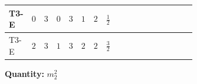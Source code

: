 \documentclass[8pt]{article}
\begin{document}
\begin{landscape}
\begin{longtable}{@{}llcccccc >{\raggedright\arraybackslash}p{0.21\linewidth} >{\raggedright\arraybackslash}p{0.21\linewidth} >{\raggedright\arraybackslash}p{0.21\linewidth}@{}}
\midrule
T3-E & $0$ & $3$ & $0$ & $3$ & $1$ & $2$ & $\frac{1}{2}$ & \scriptsize\adjustbox{max width=\linewidth}{$\begin{gathered} {m_2^2} (2 T_{\nu}^{(2)}+8 {\lambda_{S_2}^{(1)}}+4 {\lambda_{S_2}^{(A)}})\end{gathered}$} & \scriptsize\adjustbox{max width=\linewidth}{$\begin{gathered} -4 \operatorname{Tr}\!\left({M_F}\,\left({y_2}\right)^{\dagger}\,{y_2}\,\left({M_F}\right)^{\dagger}\right)\end{gathered}$} & \scriptsize\adjustbox{max width=\linewidth}{$\begin{gathered} -12 {g_2}^2 {m_2^2}\end{gathered}$} \\
\midrule
T3-E & $2$ & $3$ & $1$ & $3$ & $2$ & $2$ & $\frac{3}{2}$ & \scriptsize\adjustbox{max width=\linewidth}{$\begin{gathered} {m_2^2} (2 T_{\nu}^{(2)}+8 {\lambda_{S_2}^{(1)}}+4 {\lambda_{S_2}^{(A)}})\end{gathered}$} & \scriptsize\adjustbox{max width=\linewidth}{$\begin{gathered} -4 \operatorname{Tr}\!\left({M_F}\,\left({y_2}\right)^{\dagger}\,{y_2}\,\left({M_F}\right)^{\dagger}\right)\end{gathered}$} & \scriptsize\adjustbox{max width=\linewidth}{$\begin{gathered} -12 {g_2}^2 {m_2^2}\end{gathered}$} \\
\midrule
\bottomrule
\end{longtable}
\clearpage
\noindent\textbf{Quantity: }$m_2^2$\par\smallskip

\end{landscape}
\end{document}
